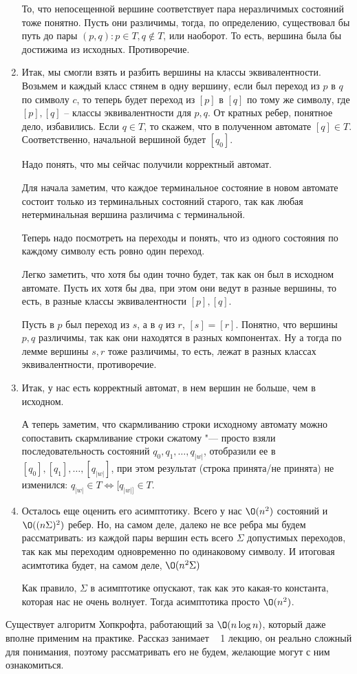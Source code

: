 \begin{enumerate}
То, что непосещенной вершине соответствует пара неразличимых состояний тоже понятно. 
Пусть они различимы, тогда, по определению, существовал бы путь до пары $(p, q): p \in T, q \notin T$, или наоборот. То есть, вершина была бы достижима из исходных. 
Противоречие.
\item
Итак, мы смогли взять и разбить вершины на классы эквивалентности. 
Возьмем и каждый класс стянем в одну вершину, если был переход из $p$ в $q$ по символу $c$, то теперь будет переход из $[p]$ в $[q]$ по тому же символу, где $[p], [q]$ -- классы эквивалентности для $p, q$. 
От кратных ребер, понятное дело, избавились.
Если $q \in T$, то скажем, что в полученном автомате $[q] \in T$. Соответственно, начальной вершиной будет $[q_0]$.

Надо понять, что мы сейчас получили корректный автомат.

Для начала заметим, что каждое терминальное состояние в новом автомате состоит только из терминальных состояний старого, так как любая нетерминальная вершина различима с терминальной.

Теперь надо посмотреть на переходы и понять, что из одного состояния по каждому символу есть ровно один переход. 

Легко заметить, что хотя бы один точно будет, так как он был в исходном автомате. 
Пусть их хотя бы два, при этом они ведут в разные вершины, то есть, в разные классы эквивалентности $[p], [q]$. %

Пусть в $p$ был переход из $s$, а в $q$ из $r$, $[s] = [r]$. Понятно, что вершины $p, q$ различимы, так как они находятся в разных компонентах. 
Ну а тогда по лемме вершины $s, r$ тоже различимы, то есть, лежат в разных классах эквивалентности, противоречие.

\item
Итак, у нас есть корректный автомат, в нем вершин не больше, чем в исходном.

А теперь заметим, что скармливанию строки исходному автомату можно сопоставить скармливание строки сжатому "--- просто взяли последовательность состояний $q_0, q_1, \dots, q_{|w|}$, отобразили ее в 
$[q_0], [q_1], \dots, [q_{|w|}]$, при этом результат (строка принята/не принята) не изменился: $q_{|w|} \in T \iff [q_{|w|]} \in T$.

\item
Осталось еще оценить его асимптотику. Всего у нас $\O(n^2)$ состояний и $\O((n\Sigma)^2)$ ребер. 
Но, на самом деле, далеко не все ребра мы будем рассматривать: из каждой пары вершин есть всего $\Sigma$ допустимых переходов, так как мы переходим одновременно по одинаковому символу.
И итоговая асимтотика будет, на самом деле, $\O(n^2 \Sigma)$

Как правило, $\Sigma$ в асимптотике опускают, так как это какая-то константа, которая нас не очень волнует. Тогда асимптотика просто $\O(n^2)$.
\end{enumerate}
\begin{Rem}
Существует алгоритм Хопкрофта, работающий за $\O(n \log n)$, который даже вполне применим на практике. 
Рассказ занимает ~ 1 лекцию, он реально сложный для понимания, поэтому рассматривать его не будем, желающие могут с ним ознакомиться.
\end{Rem}

